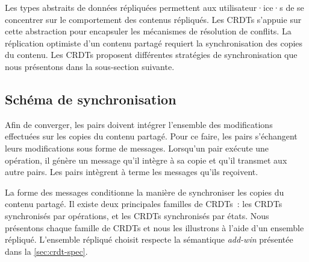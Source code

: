 

Les types abstraits de données répliquées permettent aux utilisateur·ice·s de se concentrer sur le comportement des contenus répliqués.
Les \acp{CRDT} s'appuie sur cette abstraction pour encapsuler les mécanismes de résolution de conflits.
La réplication optimiste d'un contenu partagé requiert la synchronisation des copies du contenu.
Les \acp{CRDT} proposent différentes stratégies de synchronisation que nous présentons dans la sous-section suivante.


\subsection{Schéma de synchronisation}\label{sec:crdt-sync}

Afin de converger, les pairs doivent intégrer l'ensemble des modifications effectuées sur les copies du contenu partagé.
Pour ce faire, les pairs s'échangent leurs modifications sous forme de messages.
Lorsqu'un pair exécute une opération, il génère un message qu'il intègre à sa copie et qu'il transmet aux autre pairs.
Les pairs intègrent à terme les messages qu'ils reçoivent.

La forme des messages conditionne la manière de synchroniser les copies du contenu partagé.
Il existe deux principales familles de \acp{CRDT}~: les \acp{CRDT} synchronisés par opérations, et les \acp{CRDT} synchronisés par états.
Nous présentons chaque famille de \acp{CRDT} et nous les illustrons à l'aide d'un ensemble répliqué.
L'ensemble répliqué choisit respecte la sémantique \emph{add-win} présentée dans la \autoref{sec:crdt-spec}.


